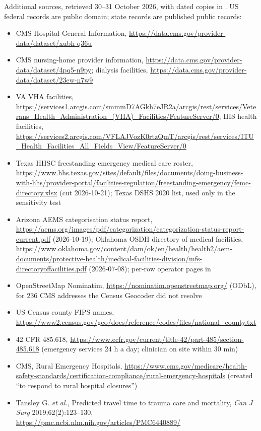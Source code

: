 \documentclass[a4paper]{article}
\begin{document}
\noindent\footnotesize Additional sources, retrieved 30--31 October 2026, with dated copies in
. US federal records are public domain; state records are published public records:
\begin{sloppypar}
\begin{itemize}\footnotesize
\item CMS Hospital General Information, \url{https://data.cms.gov/provider-data/dataset/xubh-q36u}
\item CMS nursing-home provider information, \url{https://data.cms.gov/provider-data/dataset/4pq5-n9py}; dialysis facilities, \url{https://data.cms.gov/provider-data/dataset/23ew-n7w9}
\item VA VHA facilities, \url{https://services1.arcgis.com/smmmD7AGkh7eJR2a/arcgis/rest/services/Veterans_Health_Administration_(VHA)_Facilities/FeatureServer/0}; IHS health facilities, \url{https://services2.arcgis.com/VFLAJVozK0rtzQmT/arcgis/rest/services/ITU_Health_Facilities_All_Fields_View/FeatureServer/0}
\item Texas HHSC freestanding emergency medical care roster, \url{https://www.hhs.texas.gov/sites/default/files/documents/doing-business-with-hhs/provider-portal/facilities-regulation/freestanding-emergency/femc-directory.xlsx} (cut 2026-10-21); Texas DSHS 2020 list, used only in the sensitivity test
\item Arizona AEMS categorisation status report, \url{https://aems.org/images/pdf/categorization/categorization-status-report-current.pdf} (2026-10-19); Oklahoma OSDH directory of medical facilities, \url{https://www.oklahoma.gov/content/dam/ok/en/health/health2/aem-documents/protective-health/medical-facilities-division/mfs-directoryoffacilities.pdf} (2026-07-08); per-row operator pages in 
\item OpenStreetMap Nominatim, \url{https://nominatim.openstreetmap.org/} (ODbL), for 236 CMS addresses the Census Geocoder did not resolve
\item US Census county FIPS names, \url{https://www2.census.gov/geo/docs/reference/codes/files/national_county.txt}
\item 42 CFR 485.618, \url{https://www.ecfr.gov/current/title-42/part-485/section-485.618} (emergency services 24 h a day; clinician on site within 30 min)
\item CMS, Rural Emergency Hospitals, \url{https://www.cms.gov/medicare/health-safety-standards/certification-compliance/rural-emergency-hospitals} (created ``to respond to rural hospital closures'')
\item Tansley G. \emph{et al.}, Predicted travel time to trauma care and mortality, \emph{Can J Surg} 2019;62(2):123--130, \url{https://pmc.ncbi.nlm.nih.gov/articles/PMC6440889/}
\end{itemize}
\end{sloppypar}
\end{document}
